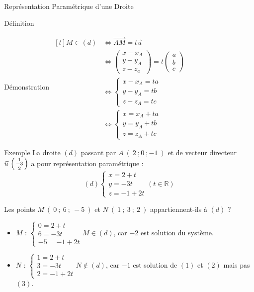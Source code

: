 \documentclass{cours}
\begin{document}
\begin{Gpartie}{Représentation Paramétrique d'une Droite}
\begin{Spartie}{Définition}
\begin{SSpartie}{Démonstration}
                $\begin{aligned}[t]
                    M\in(d)&\iff\overrightarrow{AM}=t\vec{u} \\
                    &\iff\begin{pmatrix} x-x_A \\ y-y_A \\ z-z_a \end{pmatrix}=t\begin{pmatrix} a \\ b \\ c \end{pmatrix} \\
                    &\iff\begin{cases}x-x_A=ta \\ y-y_A=tb \\ z-z_A= t c \end{cases} \\ %
                    &\iff\begin{cases}x=x_A+ta \\ y=y_A+tb \\ z=z_A+ t c \end{cases}
                \end{aligned}$
            \end{SSpartie}
        \end{Spartie}
        \begin{Spartie}{Exemple} 
            La droite $(d)$ passant par $A~\left(~2~;0~;-1~\right)$ et de vecteur directeur $\vec{u}~\begin{psmallmatrix}1 \\ -3 \\ 2\end{psmallmatrix}$ a pour représentation paramétrique : \[(d)\begin{cases} x=2+t \\ y=-3t \\ z=-1+2t
            \end{cases}\left(t\in\mathbb{R}\right)\]

            Les points $M~\left(~0~;~6~;~-5~\right)$ et $N~\left(~1~;~3~;~2~\right)$ appartiennent-ils à $(d)$ ?
            \begin{itemize}
                \item $M$ : $\begin{cases} 0=2+t \\ 6=-3t \\ -5=-1+2t \end{cases}M\in(d)$, car $-2$ est solution du système.
                \item $N$ : $\begin{cases} 1=2+t \\ 3=-3t \\ 2=-1+2t \end{cases}N\notin(d)$, car $-1$ est solution de $(1)$ et $(2)$ mais pas $(3)$.
            \end{itemize}
        \end{Spartie}
    \end{Gpartie}
\end{document}
